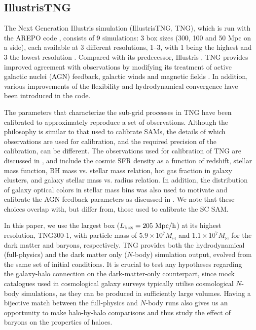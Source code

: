 \documentclass[fleqn,usenatbib]{mnras}
\begin{document}
\subsection{IllustrisTNG}
\label{sec:tng}
The Next Generation Illustris simulation (IllustrisTNG, TNG), which is run with the AREPO code \citep{2010MNRAS.401..791S,2019arXiv190904667W}, consists of 9 simulations: 3 box sizes (300, 100 and 50 Mpc on a side), each available at 3 different resolutions, 1--3, with 1 being the highest and 3 the lowest resolution \citep{2018MNRAS.475..676S,2018MNRAS.477.1206N,2018MNRAS.480.5113M,2019MNRAS.tmp.2010N,2019MNRAS.tmp.2024P,2019MNRAS.490.3196P,2019MNRAS.490.3234N}. Compared with its predecessor, Illustris \citep{2014MNRAS.444.1518V,2014Natur.509..177V,2014MNRAS.445..175G},  TNG provides improved agreement with observations by modifying its treatment of active galactic nuclei (AGN) feedback,  galactic winds and magnetic fields \citep{2018MNRAS.473.4077P,2017MNRAS.465.3291W}. In addition, various improvements of the flexibility and hydrodynamical convergence have been introduced in the code.


The parameters that characterize the sub-grid processes in TNG have been calibrated to approximately reproduce a set of observations. Although the philosophy is similar to that used to calibrate SAMs, the details of which observations are used for calibration, and the required precision of the calibration, can be different. The observations used for calibration of TNG are discussed in \citet{2018MNRAS.473.4077P}, and include the cosmic SFR density as a function of redshift, stellar mass function, BH mass vs. stellar mass relation, hot gas fraction in galaxy clusters, and galaxy stellar mass vs. radius relation. In addition, the distribution of galaxy optical colors in stellar mass bins was also used to motivate and calibrate the AGN feedback parameters as discussed in \citet{2018MNRAS.475..624N}. We note that these choices overlap with, but differ from, those used to calibrate the SC SAM.

In this paper, we use the largest box ($L_{\rm box} = 205 \ \rm{Mpc}/h$) at its highest resolution, TNG300-1, with particle mass of $5.9 \times 10^7 M_{\odot}$ and $1.1 \times 10^7 M_{\odot}$ for the dark matter and baryons, respectively. TNG provides both the hydrodynamical (full-physics) and the dark matter only ($N$-body) simulation output, evolved from the same set of initial conditions. It is crucial to test any hypotheses regarding the galaxy-halo connection on the dark-matter-only counterpart, since mock catalogues used in cosmological galaxy surveys typically utilise cosmological $N$-body simulations, as they can be produced in sufficiently large volumes. Having a bijective match between the full-physics and $N$-body runs also gives us an opportunity to make halo-by-halo comparisons and thus study the effect of baryons on the properties of haloes.
\end{document}
